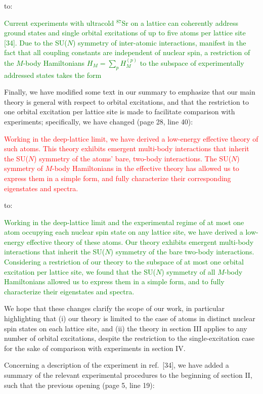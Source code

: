 \documentclass[preprint]{revtex4-1}
\newcommand{\1}{\mathds{1}}
\newcommand{\red}[1]{\textcolor{red}{#1}}
\newcommand{\green}[1]{\textcolor{green}{#1}}
\begin{document}
\begin{enumerate}
  to:

  \green{Current experiments with ultracold ${}^{87}$Sr on a lattice
    can coherently address ground states and single orbital
    excitations of up to five atoms per lattice site [34].  Due to the
    SU($N$) symmetry of inter-atomic interactions, manifest in the
    fact that all coupling constants are independent of nuclear spin,
    a restriction of the $M$-body Hamiltonians $H_M=\sum_p H_M^{(p)}$
    to the subspace of experimentally addressed states takes the form}

  Finally, we have modified some text in our summary to emphasize that
  our main theory is general with respect to orbital excitations, and
  that the restriction to one orbital excitation per lattice site is
  made to facilitate comparison with experiments; specifically, we
  have changed (page 28, line 40):

  \red{Working in the deep-lattice limit, we have derived a low-energy
    effective theory of such atoms.  This theory exhibits emergent
    multi-body interactions that inherit the SU($N$) symmetry of the
    atoms' bare, two-body interactions.  The SU($N$) symmetry of
    $M$-body Hamiltonians in the effective theory has allowed us to
    express them in a simple form, and fully characterize their
    corresponding eigenstates and spectra.}

  to:

  \green{Working in the deep-lattice limit and the experimental regime
    of at most one atom occupying each nuclear spin state on any
    lattice site, we have derived a low-energy effective theory of
    these atoms.  Our theory exhibits emergent multi-body interactions
    that inherit the SU($N$) symmetry of the bare two-body
    interactions.  Considering a restriction of our theory to the
    subspace of at most one orbital excitation per lattice site, we
    found that the SU($N$) symmetry of all $M$-body Hamiltonians
    allowed us to express them in a simple form, and to fully
    characterize their eigenstates and spectra.}

  We hope that these changes clarify the scope of our work, in
  particular highlighting that (i) our theory is limited to the case
  of atoms in distinct nuclear spin states on each lattice site, and
  (ii) the theory in section III applies to any number of orbital
  excitations, despite the restriction to the single-excitation case
  for the sake of comparison with experiments in section IV.

  Concerning a description of the experiment in ref.~[34], we have
  added a summary of the relevant experimental procedures to the
  beginning of section II, such that the previous opening (page 5,
  line 19):


\end{enumerate}
\end{document}

